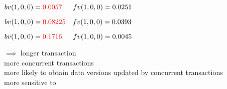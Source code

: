 \begin{frame}{}
  \begin{description}[issueDelay = 20ms:]
    \setlength{\itemsep}{10pt}
    \item[issueDelay = 20ms:] $bv(1,0,0) = \textcolor{red}{0.0057} \quad\;\; fv(1,0,0) = 0.0251$
    \item[issueDelay = 15ms:] $bv(1,0,0) = \textcolor{red}{0.08225} \quad fv(1,0,0) = 0.0393$
    \item[issueDelay = 5ms:] $bv(1,0,0) = \textcolor{red}{0.1716} \quad\;\; fv(1,0,0) = 0.0045$
  \end{description}

  \pause
  \vspace{0.50cm}
  \begin{center}
     $\implies$ longer transaction \\[5pt]
    more concurrent transactions \\[5pt]
    more likely to obtain data versions updated by concurrent transactions \\[5pt]
    more sensitive to \blue{$\ktwofv$}
  \end{center}
\end{frame}

